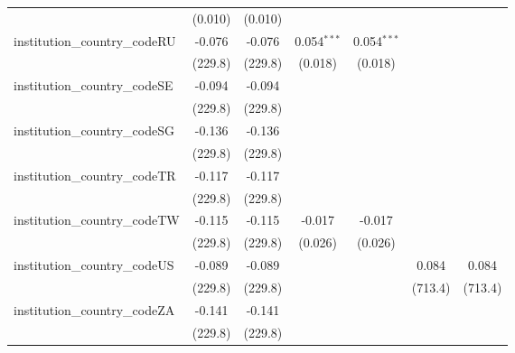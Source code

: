 \begin{tabular}{lcccccc}
                                         & (0.010)        & (0.010)        &                &                &               &   \\   
   institution\_country\_codeRU          & -0.076         & -0.076         & 0.054$^{***}$  & 0.054$^{***}$  &               &   \\   
                                         & (229.8)        & (229.8)        & (0.018)        & (0.018)        &               &   \\   
   institution\_country\_codeSE          & -0.094         & -0.094         &                &                &               &   \\   
                                         & (229.8)        & (229.8)        &                &                &               &   \\   
   institution\_country\_codeSG          & -0.136         & -0.136         &                &                &               &   \\   
                                         & (229.8)        & (229.8)        &                &                &               &   \\   
   institution\_country\_codeTR          & -0.117         & -0.117         &                &                &               &   \\   
                                         & (229.8)        & (229.8)        &                &                &               &   \\   
   institution\_country\_codeTW          & -0.115         & -0.115         & -0.017         & -0.017         &               &   \\   
                                         & (229.8)        & (229.8)        & (0.026)        & (0.026)        &               &   \\   
   institution\_country\_codeUS          & -0.089         & -0.089         &                &                & 0.084         & 0.084\\   
                                         & (229.8)        & (229.8)        &                &                & (713.4)       & (713.4)\\   
   institution\_country\_codeZA          & -0.141         & -0.141         &                &                &               &   \\   
                                         & (229.8)        & (229.8)        &                &                &               &   \\   

\end{tabular}
